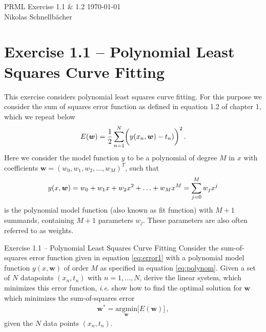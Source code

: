 \documentclass[11pt,DINA4, fleqn]{amsart}
\def\vw{\boldsymbol{w}\xspace}
\begin{document}

\tikzset{node distance=2cm, auto}





\begin{flushleft}
{\sc \Large PRML Exercise 1.1 \& 1.2} \hfill \today \\
\medskip
Nikolas Schnellbächer \underline{\hspace{6.53in}} \\
\end{flushleft}

\section*{Exercise 1.1 -- Polynomial Least Squares Curve Fitting}
This exercise considers polynomial least squares curve fitting. 
For this purpose we consider the sum of squares error function as defined in equation 1.2 of chapter 1, which we repeat below
\begin{align}
E(\vw) = \dfrac{1}{2} \sum \displaylimits_{n = 1}^{N}
\biggl(y(x_n, \vw) - t_n)\biggl)^2 \, .
\label{eq:error1}
\end{align}
Here we consider the model function $y$ to be a polynomial of degree $M$ in $x$ with coefficients $\vw = (w_0, w_1, w_2, \dots , w_M)^{T}$, such that
\begin{align}
y(x,\vw) = w_0 + w_1 x + w_2 x^2 + \dotsc + w_M x^M = \sum \displaylimits_{j = 0}^{M} w_j x^j
\label{eq:polynom}
\end{align}
is the polynomial model function (also known as fit function) with $M + 1$ summands, containing $M+1$ parameters $w_j$. These parameters are also often referred to as weights.

\begin{mybox_tc3}{Exercise 1.1 -- Polynomial Least Squares Curve Fitting}
Consider the sum-of-squares error function given in equation \eqref{eq:error1}
with a polynomial model function $y(x,\vw)$ of order $M$ as specified in equation \eqref{eq:polynom}.
Given a set of $N$ datapoints $(x_n, t_n)$ with $n = 1, \dotsc, N$,
 derive the linear system, which minimizes this
error function, \textit{i.e.} show how to find the optimal solution for $\vw$
which minimizes the sum-of-squares error
\begin{align}
\vw^{*} =  \underset{\vw}{\text{argmin}}\biggl[ E(\vw)\biggl] \, ,
\end{align}
given the $N$ data points $(x_n, t_n)$.
\end{mybox_tc3}
\end{document}
